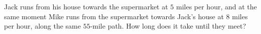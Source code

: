 Jack runs from his house towards the supermarket at $5$ miles per hour, and at the same moment Mike runs from the supermarket towards Jack's house at $8$ miles per hour, along the same $55$-mile path. How long does it take until they meet?
